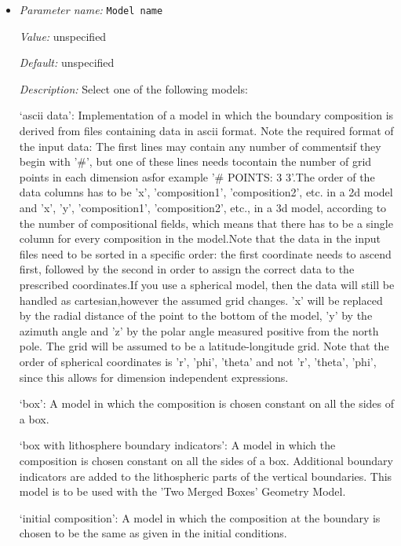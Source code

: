 \begin{itemize}
\item {\it Parameter name:} {\tt Model name}
\label{parameters:Boundary composition model/Model name}


{\it Value:} unspecified


{\it Default:} unspecified


{\it Description:} Select one of the following models:

`ascii data': Implementation of a model in which the boundary composition is derived from files containing data in ascii format. Note the required format of the input data: The first lines may contain any number of commentsif they begin with '#', but one of these lines needs tocontain the number of grid points in each dimension asfor example '# POINTS: 3 3'.The order of the data columns has to be 'x', 'composition1', 'composition2', etc. in a 2d model and 'x', 'y', 'composition1', 'composition2', etc., in a 3d model, according to the number of compositional fields, which means that there has to be a single column for every composition in the model.Note that the data in the input files need to be sorted in a specific order: the first coordinate needs to ascend first, followed by the second in order to assign the correct data to the prescribed coordinates.If you use a spherical model, then the data will still be handled as cartesian,however the assumed grid changes. 'x' will be replaced by the radial distance of the point to the bottom of the model, 'y' by the azimuth angle and 'z' by the polar angle measured positive from the north pole. The grid will be assumed to be a latitude-longitude grid. Note that the order of spherical coordinates is 'r', 'phi', 'theta' and not 'r', 'theta', 'phi', since this allows for dimension independent expressions. 

`box': A model in which the composition is chosen constant on all the sides of a box.

`box with lithosphere boundary indicators': A model in which the composition is chosen constant on all the sides of a box. Additional boundary indicators are added to the lithospheric parts of the vertical boundaries. This model is to be used with the 'Two Merged Boxes' Geometry Model.

`initial composition': A model in which the composition at the boundary is chosen to be the same as given in the initial conditions.


\end{itemize}

